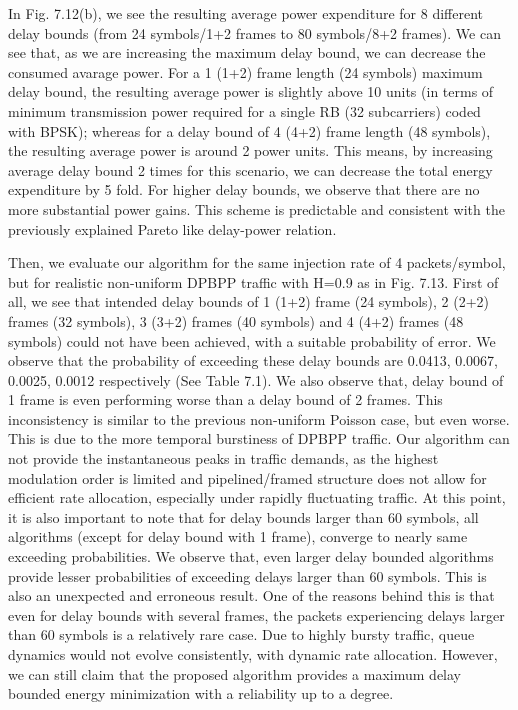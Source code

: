 In Fig. 7.12(b), we see the resulting average power expenditure for 8 different delay bounds (from 24 symbols/1+2 frames to 80 symbols/8+2 frames). We can see that, as we are increasing the maximum delay bound, we can decrease the consumed avarage power. For a 1 (1+2) frame length (24 symbols) maximum delay bound, the resulting average power is slightly above 10 units (in terms of minimum transmission power required for a single RB (32 subcarriers) coded with BPSK); whereas for a delay bound of 4 (4+2) frame length (48 symbols), the resulting average power is around 2 power units. This means, by increasing average delay bound 2 times for this scenario, we can decrease the total energy expenditure by 5 fold. For higher delay bounds, we observe that there are no more substantial power gains. This scheme is predictable and consistent with the previously explained Pareto like delay-power relation.

Then, we evaluate our algorithm for the same injection rate of 4 packets/symbol, but for realistic non-uniform DPBPP traffic with H=0.9 as in Fig. 7.13. First of all, we see that intended delay bounds of 1 (1+2) frame (24 symbols), 2 (2+2) frames (32 symbols), 3 (3+2) frames (40 symbols) and 4 (4+2) frames (48 symbols) could  not have been achieved, with a suitable probability of error. We observe that the probability of exceeding these delay bounds are 0.0413, 0.0067, 0.0025, 0.0012 respectively (See Table 7.1). We also observe that, delay bound of 1 frame is even performing worse than a delay bound of 2 frames. This inconsistency is similar to the previous non-uniform Poisson case, but even worse. This is due to the more temporal burstiness of DPBPP traffic. Our algorithm can not provide the instantaneous peaks in traffic demands, as the highest modulation order is limited and pipelined/framed structure does not allow for efficient rate allocation, especially under rapidly fluctuating traffic. At this point, it is also important to note that for delay bounds larger than 60 symbols, all algorithms (except for delay bound with 1 frame), converge to nearly same exceeding probabilities. We observe that, even larger delay bounded algorithms provide lesser probabilities of exceeding delays larger than 60 symbols. This is also an unexpected and erroneous result. One of the reasons behind this is that even for delay bounds with several frames, the packets experiencing delays larger than 60 symbols is a relatively rare case. Due to highly bursty traffic, queue dynamics would not evolve consistently, with dynamic rate allocation. However, we can still claim that the proposed algorithm provides a maximum delay bounded energy minimization with a reliability up to a degree.  



